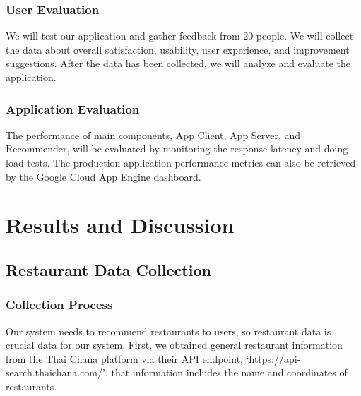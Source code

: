 \documentclass[12pt,oneside,openright,a4paper]{cpe-english-project}
\begin{document}
\subsection{User Evaluation}

We will test our application and gather feedback from 20 people. We will collect the data about overall satisfaction, usability, user experience, and improvement suggestions. After the data has been collected, we will analyze and evaluate the application.

\subsection{Application Evaluation}

The performance of main components, App Client, App Server, and Recommender, will be evaluated by monitoring the response latency and doing load tests. The production application performance metrics can also be retrieved by the Google Cloud App Engine dashboard.


\chapter{Results and Discussion}

\section{Restaurant Data Collection}

\subsection{Collection Process}


Our system needs to recommend restaurants to users, so restaurant data is crucial data for our system. First, we obtained general restaurant information from the Thai Chana platform via their API endpoint, ‘https://api-search.thaichana.com/’, that information includes the name and coordinates of restaurants.
\end{document}
